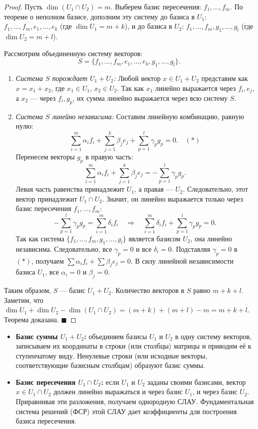 \begin{proof}
Пусть $\dim(U_1 \cap U_2) = m$. Выберем базис пересечения: $f_1, \dots, f_m$. 
По теореме о неполном базисе, дополним эту систему до базиса в $U_1$: $f_1, \dots, f_m, e_1, \dots, e_k$ (где $\dim U_1 = m + k$), и до базиса в $U_2$: $f_1, \dots, f_m, g_1, \dots, g_l$ (где $\dim U_2 = m + l$).

Рассмотрим объединенную систему векторов:
\[
S = \{ f_1, \dots, f_m, e_1, \dots, e_k, g_1, \dots, g_l \}.
\]
\begin{enumerate}
    \item \textit{Система $S$ порождает $U_1 + U_2$:} Любой вектор $x \in U_1 + U_2$ представим как $x = x_1 + x_2$, где $x_1 \in U_1$, $x_2 \in U_2$. Так как $x_1$ линейно выражается через $f_i, e_j$, а $x_2$ --- через $f_i, g_p$, их сумма линейно выражается через всю систему $S$.
    \item \textit{Система $S$ линейно независима:} Составим линейную комбинацию, равную нулю:
    \[
    \sum_{i=1}^m \alpha_i f_i + \sum_{j=1}^k \beta_j e_j + \sum_{p=1}^l \gamma_p g_p = 0. \quad (*)
    \]
    Перенесем векторы $g_p$ в правую часть:
    \[
    \sum_{i=1}^m \alpha_i f_i + \sum_{j=1}^k \beta_j e_j = - \sum_{p=1}^l \gamma_p g_p.
    \]
    Левая часть равенства принадлежит $U_1$, а правая --- $U_2$. Следовательно, этот вектор принадлежит $U_1 \cap U_2$. Значит, он линейно выражается только через базис пересечения $f_1, \dots, f_m$:
    \[
    - \sum_{p=1}^l \gamma_p g_p = \sum_{i=1}^m \delta_i f_i \quad \Rightarrow \quad \sum_{i=1}^m \delta_i f_i + \sum_{p=1}^l \gamma_p g_p = 0.
    \]
    Так как система $\{f_1, \dots, f_m, g_1, \dots, g_l\}$ является базисом $U_2$, она линейно независима. Следовательно, все $\gamma_p = 0$ и все $\delta_i = 0$. 
    Подставляя $\gamma_p = 0$ в $(*)$, получаем $\sum \alpha_i f_i + \sum \beta_j e_j = 0$. В силу линейной независимости базиса $U_1$, все $\alpha_i = 0$ и $\beta_j = 0$.
\end{enumerate}
Таким образом, $S$ --- базис $U_1 + U_2$. Количество векторов в $S$ равно $m + k + l$. 
Заметим, что $\dim U_1 + \dim U_2 - \dim(U_1 \cap U_2) = (m+k) + (m+l) - m = m+k+l$. Теорема доказана.
\hfill$\blacksquare$
\end{proof}

\begin{remark}
\begin{itemize}
    \item \textbf{Базис суммы $U_1 + U_2$:} объединяем базисы $U_1$ и $U_2$ в одну систему векторов, записываем их координаты в строки (или столбцы) матрицы и приводим её к ступенчатому виду. Ненулевые строки (или исходные векторы, соответствующие базисным столбцам) образуют базис суммы.
    \item \textbf{Базис пересечения $U_1 \cap U_2$:} если $U_1$ и $U_2$ заданы своими базисами, вектор $x \in U_1 \cap U_2$ должен линейно выражаться и через базис $U_1$, и через базис $U_2$. Приравнивая эти разложения, получаем однородную СЛАУ. Фундаментальная система решений (ФСР) этой СЛАУ дает коэффициенты для построения базиса пересечения.
\end{itemize}
\end{remark}
